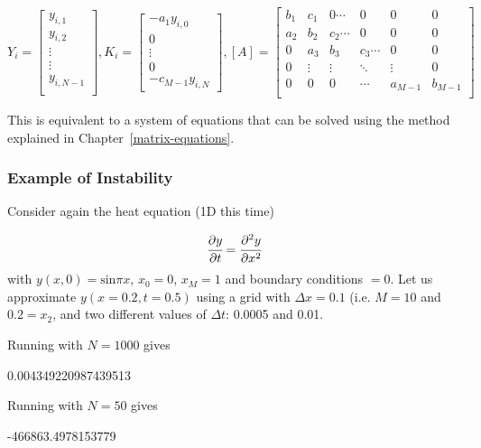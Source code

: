 \begin{equation*}
Y_i =
\begin{bmatrix}
y_{i, 1}\\
y_{i, 2}\\
\vdots\\
\vdots\\
y_{i,N-1}\\
\end{bmatrix},
K_i=
\begin{bmatrix}
-a_1 y_{i,0}\\
0\\
\vdots\\
0\\
-c_{M-1}y_{i,N}
\end{bmatrix},
[A] = 
\begin{bmatrix}
b_1 & c_1 & 0 \cdots & 0 & 0 & 0 \\
a_2 & b_2 & c_2 \cdots & 0 & 0 & 0\\
0  & a_3 & b_3 & c_3\cdots & 0 & 0 \\
0  & \vdots & \vdots & \ddots & \vdots & 0 \\
0 & 0 & 0 & \cdots & a_{M-1} & b_{M-1} \\
\end{bmatrix}
\end{equation*}

This is equivalent to a system of equations that can be solved using the method explained in Chapter~\ref{matrix-equations}.

\subsubsection{Example of Instability}
Consider again the heat equation (1D this time)

\begin{equation}
\cfrac{\partial y}{\partial t} = \cfrac{\partial^2 y}{\partial x^2}
\end{equation}
\noindent
with $y(x, 0) = \textrm{sin}\pi x$, $x_{0} = 0$, $x_M = 1$ and boundary conditions $= 0$. Let us approximate $y(x = 0.2, t = 0.5)$ using a grid with $\Delta x = 0.1$ (i.e. $M = 10$ and $0.2 = x_2$, and two different values of $\Delta t$: 0.0005 and 0.01.

\noindent
Running with $N=1000$ gives
\begin{ioutput}
0.004349220987439513
\end{ioutput}
\noindent
Running with $N=50$ gives
\begin{ioutput}
-466863.4978153779
\end{ioutput}

